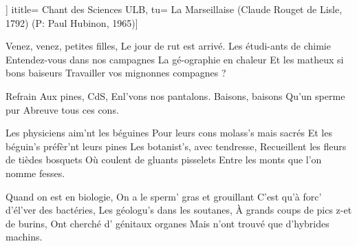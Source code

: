 ]
ititle= {Chant des Sciences ULB},
tu= {La Marseillaise (Claude Rouget de Lisle, 1792) (P: Paul Hubinon, 1965)}]

\beginverse
Venez, venez, petites filles,
Le jour de rut est arrivé.
Les étudi-ants de chimie
Entendez-vous dans nos campagnes
La gé-ographie en chaleur
Et les matheux si bons baiseurs
Travailler vos mignonnes compagnes ?
\endverse

\beginchorus
Refrain
Aux pines, CdS,
Enl'vons nos pantalons.
Baisons, baisons
Qu'un sperme pur
Abreuve tous ces cons.
\endchorus

\beginverse
Les physiciens aim'nt les béguines
Pour leurs cons molass's mais sacrés
Et les béguin's préfèr'nt leurs pines
Les botanist's, avec tendresse,
Recueillent les fleurs de tièdes bosquets
Où coulent de gluants pisselets
Entre les monts que l'on nomme fesses.
\endverse

\beginverse
Quand on est en biologie,
On a le sperm' gras et grouillant
C'est qu'à forc' d'él'ver des bactéries,
Les géologu's dans les soutanes,
À grands coups de pics z-et de burins,
Ont cherché d' génitaux organes
Mais n'ont trouvé que d'hybrides machins.
\endverse

\endsong
